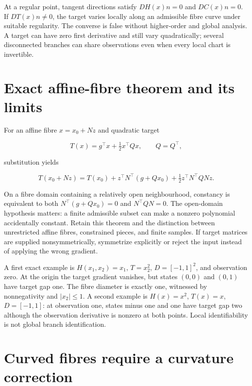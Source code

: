 \documentclass[
  11pt,
  a4paper,
]{report}
\begin{document}
At a regular point, tangent directions satisfy \(DH(x)n=0\) and
\(DC(x)n=0\). If \(DT(x)n\ne0\), the target varies locally along an
admissible fibre curve under suitable regularity. The converse is false
without higher-order and global analysis. A target can have zero first
derivative and still vary quadratically; several disconnected branches
can share observations even when every local chart is invertible.

\hypertarget{exact-affine-fibre-theorem-and-its-limits}{%
\section{Exact affine-fibre theorem and its
limits}\label{exact-affine-fibre-theorem-and-its-limits}}

For an affine fibre \(x=x_0+Nz\) and quadratic target

\[
 T(x)=g^\top x+\tfrac12x^\top Qx,\qquad Q=Q^\top,
\]

substitution yields

\[
 T(x_0+Nz)=T(x_0)+z^\top N^\top(g+Qx_0)
 +\tfrac12z^\top N^\top QNz.
\]

On a fibre domain containing a relatively open neighbourhood, constancy
is equivalent to both \(N^\top(g+Qx_0)=0\) and \(N^\top QN=0\). The
open-domain hypothesis matters: a finite admissible subset can make a
nonzero polynomial accidentally constant. Retain this theorem and the
distinction between unrestricted affine fibres, constrained pieces, and
finite samples. If target matrices are supplied nonsymmetrically,
symmetrize explicitly or reject the input instead of applying the wrong
gradient.

A first exact example is \(H(x_1,x_2)=x_1\), \(T=x_2^2\),
\(D=[-1,1]^2\), and observation zero. At the origin the target gradient
vanishes, but states \((0,0)\) and \((0,1)\) have target gap one. The
fibre diameter is exactly one, witnessed by nonnegativity and
\(|x_2|\le1\). A second example is \(H(x)=x^2\), \(T(x)=x\),
\(D=[-1,1]\): at observation one, states minus one and one have target
gap two although the observation derivative is nonzero at both points.
Local identifiability is not global branch identification.

\hypertarget{curved-fibres-require-a-curvature-correction}{%
\section{Curved fibres require a curvature
correction}\label{curved-fibres-require-a-curvature-correction}}
\end{document}
